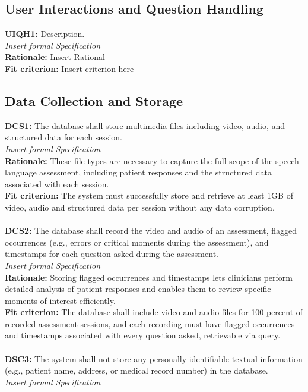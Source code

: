 \documentclass[12pt]{article}
\begin{document}
\subsection{User Interactions and Question Handling}
\textbf{UIQH1: } Description.\\
\textit{Insert formal Specification}\\
\textbf{Rationale: } Insert Rational\\
\textbf{Fit criterion: } Insert criterion here 

\subsection{Data Collection and Storage}
\textbf{DCS1: }The database shall store multimedia files including video, audio, and structured data for 
each session.\\
\textit{Insert formal Specification}\\
\textbf{Rationale: } These file types are necessary to capture the full scope of the speech-language assessment, 
including patient responses and the structured data associated with each session.\\
\textbf{Fit criterion: } The system must successfully store and retrieve at least 1GB of video, audio and 
structured data per session without any data corruption. \\\\
\textbf{DCS2: }The database shall record the video and audio of an assessment, flagged occurrences (e.g., errors
 or critical moments during the assessment), and timestamps for each question asked during the assessment.\\
\textit{Insert formal Specification}\\
\textbf{Rationale: } Storing flagged occurrences and timestamps lets clinicians perform detailed analysis 
of patient responses and enables them to review specific moments of interest efficiently.\\
\textbf{Fit criterion: } The database shall include video and audio files for 100 percent of recorded assessment 
sessions, and each recording must have flagged occurrences and timestamps associated with every question asked, 
 retrievable via query. \\\\
\textbf{DSC3: }The system shall not store any personally identifiable textual information (e.g., patient name, 
address, or medical record number) in the database.\\
\textit{Insert formal Specification}\\
\end{document}
